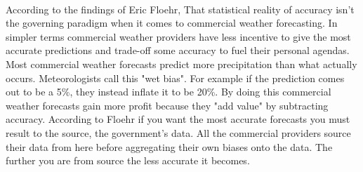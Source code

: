 \documentclass[12pt]{article}
\begin{document}
\begin{enumerate}
 \\ 
According to the findings of Eric Floehr, That statistical reality of accuracy isn't the governing paradigm when it comes to commercial weather forecasting. In simpler terms commercial weather providers have less incentive to give the most accurate predictions and trade-off some accuracy to fuel their personal agendas. Most commercial weather forecasts predict more precipitation than what actually occurs. Meteorologists call this "wet bias". For example if the prediction comes out to be a 5\%, they instead inflate it to be 20\%. By doing this commercial weather forecasts gain more profit because they "add value" by subtracting accuracy. According to Floehr if you want the most accurate forecasts you must result to the source, the government's data. All the commercial providers source their data from here before aggregating their own biases onto the data. The further you are from source the less accurate it becomes.

 \\ 


\end{enumerate}
\end{document}
